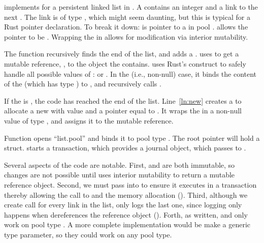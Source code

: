  implements  for a persistent linked list in \this{}.  A  contains an integer and a link to the next .  The link is of type , which might seem daunting, but this is typical for a Rust pointer declaration.  To break it down:  is pointer to a  in pool .   allows the pointer to be .  Wrapping the  in  allows for modification via interior mutability.

The function  recursively finds the end of the list,  and adds a .   uses  to get a mutable reference, , to the  object the  contains.  uses Rust's  construct to safely handle all possible values of :  or .  In the  (i.e., non-null) case, it binds the content of the  (which has type ) to , and recursively calls .

If the  is , the code has reached the end of the list.  Line~\ref{ln:new} creates a  to allocate a new  with value  and a  pointer equal to .  It wraps the  in a non-null value of type , and assigns it to the mutable reference.


Function  opens ``list.pool'' and binds it to pool type .  The root pointer will hold a  struct.   starts a transaction, which provides a journal object, which  passes to .

Several aspects of the code are notable.  First,  and  are both immutable, so changes are not possible until  uses interior mutability to return a mutable reference object.  Second, we must pass  into  to ensure it executes in a transaction thereby allowing the call to   and the memory allocation ().  Third, although we create call  for every link in the list, \this{} only logs the last one, since logging only happens when  dereferences the reference object ().  Forth, as written,  and  only work on pool type .  A more complete implementation would be make  a generic type parameter, so they could work on any pool type.

